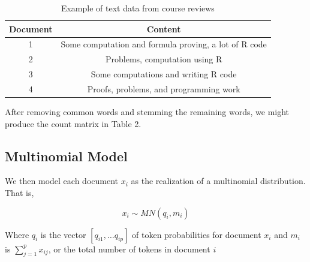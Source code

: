 \documentclass[12pt]{article}
\begin{document}
\begin{table}[!hbpt]
\caption{Example of text data from course reviews} \label{tab:title}
\begin{center}
\begin{tabular} {c c}
\textbf{Document} & \textbf{Content} \\
\hline
1 & Some computation and formula proving, a lot of R code \\
2 & Problems, computation using R \\
3 & Some computations and writing R code\\
4 & Proofs, problems, and programming work \\
\end{tabular}
\end{center}
\end{table}



After removing common words and stemming the remaining words, we might
produce the count matrix in Table 2. 


\begin{table}[!hbpt]
\caption{Creating a word-count matrix from text}
\begin{center}
\end{center}
\end{table} 



\subsection{Multinomial Model}\label{multinomial-model}

We then model each document $x_i$ as the realization of a multinomial
distribution. That is,

\[ x_{i} \sim MN(q_i,m_i) \]

Where $q_i$ is the vector $[q_{i1}, \dots q_{ip}]$ of token
probabilities for document $x_i$ and $m_i$ is
$\sum_{j = 1}^{p}{x_{ij}}$, or the total number of tokens in document
$i$
\end{document}
